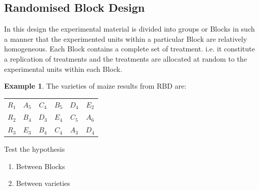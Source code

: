 \documentclass[11pt,a4paper]{article}
\theoremstyle{definition}
\newtheorem{example}[thm]{Example}
\begin{document}
\subsection{Randomised Block Design}
In this design the experimental material is divided into groups or Blocks in such a manner that the experimented units within a particular Block are relatively homogeneous. Each Block contains a complete set of treatment. i.e. it constitute a replication of treatments and the treatments are allocated at random to the experimental units within each Block.\\[1ex]

\begin{example}
The varieties of maize results from RBD are:

\begin{table}[H]
\begin{tabular}{c|c|c|c|c|c|}
$R_1$ & $A_5$ & $C_4$ & $B_5$ & $D_4$ & $E_2$\\
$R_2$ & $B_4$ & $D_3$ & $E_4$ & $C_5$ & $A_6$\\
$R_3$ & $E_3$ & $B_4$ & $C_4$ & $A_3$ & $D_4$\\
\end{tabular}
\end{table}

Test the hypothesis
\begin{enumerate}
\item Between Blocks
\item Between varieties\\
\end{enumerate}
\end{example}
\end{document}
